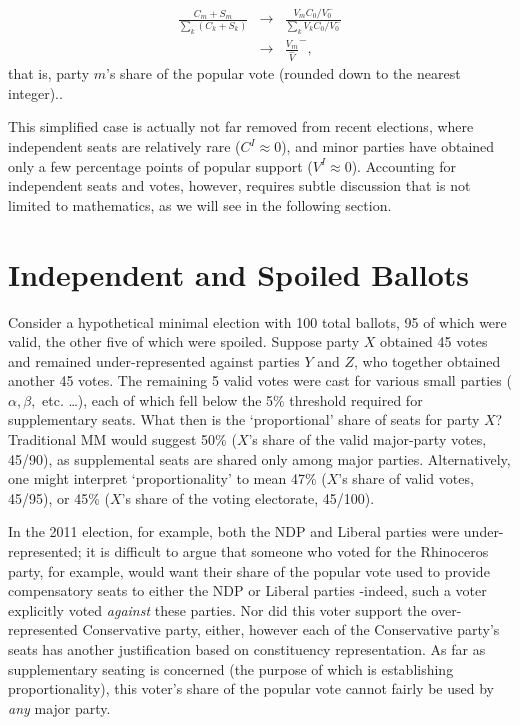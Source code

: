 \begin{align}
\label{eq:seatshare}
\frac{C_m+S_m}{ \sum\limits_k\left( C_k+S_k \right)} &\to& \frac{V_m C_0/V_0^-}{ \sum\limits_k V_k C_0/V_0^-} \\
&\to& \frac{V_m}{\hat{V}}^-,
\end{align}
that is, party $m$'s share of the popular vote (rounded down to the nearest integer)..

This simplified case is actually not far removed from recent elections, where independent seats are relatively rare ($C^I\approx0$), and minor parties have obtained only a few percentage points of popular support ($V^I \approx 0$).
Accounting for independent seats and votes, however, requires subtle discussion that is not limited to mathematics, as we will see in the following section.


\section{Independent and Spoiled Ballots}
\label{sec:outliers}
Consider a hypothetical minimal election with 100 total ballots, 95 of which were valid, the other five of which were spoiled. Suppose party $X$ obtained 45 votes and remained under-represented against parties $Y$ and $Z$, who together obtained another 45 votes. The remaining 5 valid votes were cast for various small parties ($\alpha,\beta,$ etc. \ldots), each of which fell below the 5\% threshold required for supplementary seats.
What then is the `proportional' share of seats for party $X$?
Traditional MM would suggest 50\% ($X$'s share of the valid major-party votes, 45/90), as supplemental seats are shared only among major parties. Alternatively, one might interpret `proportionality' to mean 47\% ($X$'s share of valid votes, 45/95), or 45\% ($X$'s share of the voting electorate, 45/100).


In the 2011 election, for example, both the NDP and Liberal parties were under-represented; it is difficult to argue that someone who voted for the Rhinoceros party, for example, would want their share of the popular vote used to provide compensatory seats to either the NDP or Liberal parties \--indeed, such a voter explicitly voted \emph{against} these parties.
Nor did this voter support the over-represented Conservative party, either, however each of the Conservative party’s seats has another justification based on constituency representation.
As far as supplementary seating is concerned (the purpose of which is establishing proportionality), this voter’s share of the popular vote cannot fairly be used by \emph{any} major party.


